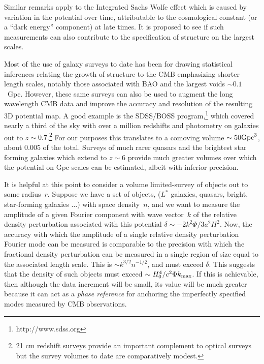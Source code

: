\documentclass[psfig,12pt]{article}
\def\ni{\noindent}
\begin{document}
{Similar remarks apply to the Integrated Sachs Wolfe effect which is
caused by variation in the potential over time, attributable to the
cosmological constant (or a ``dark energy'' component) at late times.
It is proposed to see if such
measurements can also contribute to the specification of structure on
the largest scales.

\ni{\bf Galaxy Surveys and the ``Local'' Universe:}
Most of the use of galaxy surveys to date has been for drawing statistical inferences
relating the growth of structure to the CMB emphasizing shorter length
scales, notably those associated with BAO and the largest voids
$\sim0.1$~Gpc. However, these same surveys can also be used to augment
the long wavelength CMB data and improve the accuracy and resolution of
the resulting 3D potential map. A good example is the SDSS/BOSS
program,\footnote{http://www.sdss.org} which covered nearly a third of
the sky with over a million redshifts and photometry on galaxies out to
$z\sim0.7$.\footnote{21 cm redshift surveys provide an important
complement to optical surveys but the survey volumes to date are
comparatively modest.} For our purposes this translates to a comoving
volume $\sim50{\rm Gpc}^3$, about 0.005 of the total. Surveys of much
rarer quasars and the brightest star forming galaxies which extend to
$z\sim6$ provide much greater volumes over which the potential on Gpc
scales can be estimated, albeit with inferior precision.

It is helpful at this point to consider a volume limited-survey of
objects out to some radius~$r$. Suppose we have a set of objects,
($L^\ast$ galaxies, quasars, bright, star-forming galaxies $\dots$) with
space density~$n$, and we want to measure the amplitude of a given
Fourier component with wave vector~$k$ of the relative density
perturbation associated with this potential
$\delta\sim-2k^2\Phi/3a^2H^2$. Now, the accuracy with which the amplitude
of a single relative density perturbation Fourier mode can be measured
is comparable to the precision with which the fractional density
perturbation can be measured in a single region of size equal to the
associated length scale. This is $\sim k^{3/2}n^{-1/2}$, and must exceed
$\delta$. This suggests that the density of such objects must exceed
$\sim H_0^4/c^2\Phi k_{\rm max}$. If this is
achievable, then although the data increment will be small, its value
will be much greater because it can act as a {\it phase reference} for
anchoring the imperfectly specified modes measured by CMB observations.

}
\end{document}
